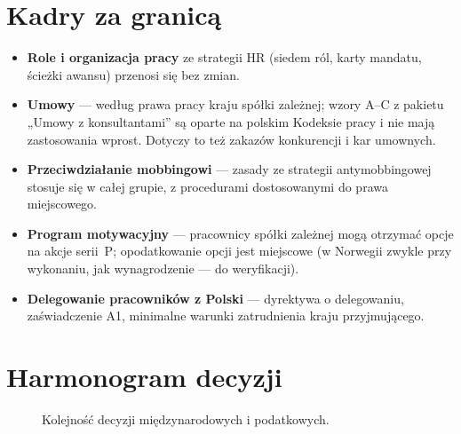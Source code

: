 \documentclass[11pt,a4paper]{report}
\begin{document}
\section{Kadry za granicą}

\begin{itemize}
  \item \textbf{Role i organizacja pracy} ze strategii HR (siedem ról, karty mandatu, ścieżki awansu) przenosi się bez zmian.
  \item \textbf{Umowy} --- według prawa pracy kraju spółki zależnej; wzory A--C z pakietu „Umowy z konsultantami” są oparte na polskim Kodeksie pracy i nie mają zastosowania wprost. Dotyczy to też zakazów konkurencji i kar umownych.
  \item \textbf{Przeciwdziałanie mobbingowi} --- zasady ze strategii antymobbingowej stosuje się w całej grupie, z procedurami dostosowanymi do prawa miejscowego.
  \item \textbf{Program motywacyjny} --- pracownicy spółki zależnej mogą otrzymać opcje na akcje serii~P; opodatkowanie opcji jest miejscowe (w Norwegii zwykle przy wykonaniu, jak wynagrodzenie --- do weryfikacji).
  \item \textbf{Delegowanie pracowników z Polski} --- dyrektywa o delegowaniu, zaświadczenie A1, minimalne warunki zatrudnienia kraju przyjmującego.
\end{itemize}

\section{Harmonogram decyzji}

\begin{figure}[H]
\centering
{}
\caption{Kolejność decyzji międzynarodowych i podatkowych.}
\end{figure}
\end{document}
